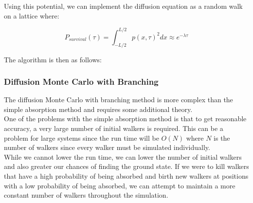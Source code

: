 \documentclass[reqno]{amsart}
\numberwithin{equation}{section}
\numberwithin{figure}{section}
\begin{document}
Using this potential, we can implement the diffusion equation as a random walk on a lattice where:

\begin{equation}
    P_{survival}(\tau) = \int_{-L/2}^{L/2} p(x, \tau)^2 dx \approx e^{-\lambda \tau}
\end{equation}

The algorithm is then as follows:



\subsubsection{Diffusion Monte Carlo with Branching}

The diffusion Monte Carlo with branching method is more complex than the simple absorption method and requires some additional theory. \\

One of the problems with the simple absorption method is that to get reasonable accuracy, a very large number of initial walkers is required. This can be a problem for large systems since the run time will be $O(N)$ where $N$ is the number of walkers since every walker must be simulated individually. \\

While we cannot lower the run time, we can lower the number of initial walkers and also greater our chances of finding the ground state. If we were to kill walkers that have a high probability of being absorbed and birth new walkers at positions with a low probability of being absorbed, we can attempt to maintain a more constant number of walkers throughout the simulation. \\
\end{document}
